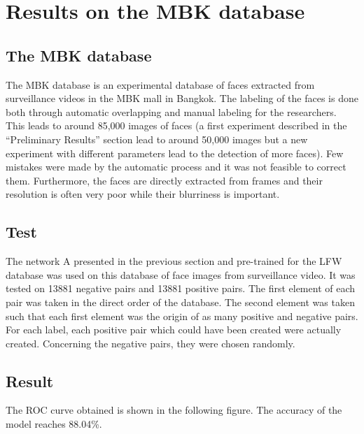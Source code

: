 \section{Results on the MBK database}
\subsection{The MBK database}
The MBK database is an experimental database of faces extracted from surveillance videos in the MBK mall in Bangkok. The labeling of the faces is done both through automatic overlapping and manual labeling for the researchers. This leads to around 85,000 images of faces (a first experiment described in the \enquote{Preliminary Results} section lead to around 50,000 images but a new experiment with different parameters lead to the detection of more faces). Few mistakes were made by the automatic process and it was not feasible to correct them. Furthermore, the faces are directly extracted from frames and their resolution is often very poor while their blurriness is important. 
\subsection{Test}
The network A presented in the previous section and pre-trained for the LFW database was used on this database of face images from surveillance video. It was tested on 13881 negative pairs and 13881 positive pairs. The first element of each pair was taken in the direct order of the database. The second element was taken such that each first element was the origin of as many positive and negative pairs. For each label, each positive pair which could have been created were actually created. Concerning the negative pairs, they were chosen randomly.
\subsection{Result}
The ROC curve obtained is shown in the following figure. The accuracy of the model reaches 88.04\%.

